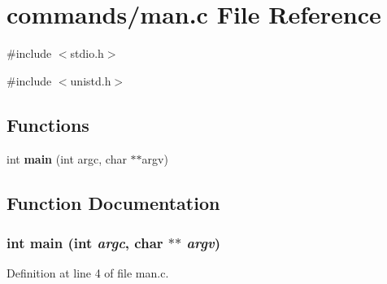 \section{commands/man.c File Reference}
\label{man_8c}
{\ttfamily \#include $<$stdio.h$>$}\par
{\ttfamily \#include $<$unistd.h$>$}\par
\subsection*{Functions}
\begin{DoxyCompactItemize}
\item 
int {\bf main} (int argc, char $\ast$$\ast$argv)
\end{DoxyCompactItemize}


\subsection{Function Documentation}
\subsubsection[{main}]{\setlength{\rightskip}{0pt plus 5cm}int main (int {\em argc}, \/  char $\ast$$\ast$ {\em argv})}\label{man_8c_a3c04138a5bfe5d72780bb7e82a18e627}


Definition at line 4 of file man.c.

